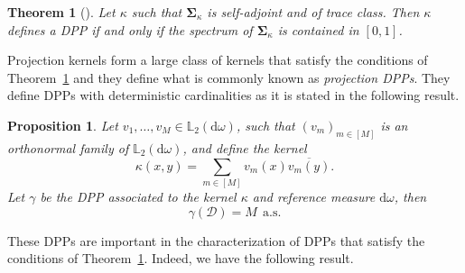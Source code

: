 \documentclass[twoside,11pt]{book}
\newtheorem{theorem}{Theorem}
\newtheorem{proposition}{Proposition}
\numberwithin{theorem}{chapter}
\numberwithin{definition}{chapter}
\numberwithin{proposition}{chapter}
\numberwithin{corollary}{chapter}
\numberwithin{example}{chapter}
\numberwithin{lemma}{chapter}
\numberwithin{assumption}{chapter}
\begin{document}
\begin{theorem} [\cite{Mac75,Sos00}] \label{thm:mac_sos}
Let $\kappa$ such that $\bm{\Sigma}_{\kappa}$ is self-adjoint and of trace class. 
Then $\kappa$ defines a DPP if and only if the spectrum of $\bm{\Sigma}_{\kappa}$ is contained in $[0,1]$.
\end{theorem}
Projection kernels form a large class of kernels that satisfy the conditions of Theorem~\ref{thm:mac_sos} and they define what is commonly known as \emph{projection DPPs}. They define DPPs with deterministic cardinalities as it is stated in the following result.


\begin{proposition}\label{prop:projection_DPP_cardinality}
Let $v_{1}, \dots, v_{M} \in \mathbb{L}_{2}(\mathrm{d}\omega)$, such that $(v_{m})_{m \in [M]}$ is an orthonormal family of $\mathbb{L}_{2}(\mathrm{d}\omega)$, and define the kernel
\begin{equation}
\kappa(x,y) = \sum\limits_{m \in [M]}v_{m}(x)\overline{v_{m}(y)}. 
\end{equation} 
Let $\gamma$ be the DPP associated to the kernel $\kappa$ and reference measure $\mathrm{d}\omega$, then 
\begin{equation}
\gamma(\mathcal{D}) = M \:\: \text{a.s.}
\end{equation}


\end{proposition}


These DPPs are important in the characterization of DPPs that satisfy the conditions of Theorem~\ref{thm:mac_sos}. Indeed, we have the following result. 
\end{document}
